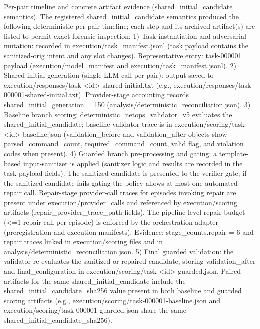\documentclass[conference]{IEEEtran}
\begin{document}
Per-pair timeline and concrete artifact evidence (shared\_initial\_candidate semantics). The registered shared\_initial\_candidate semantics produced the following deterministic per-pair timeline; each step and its archived artifact(s) are listed to permit exact forensic inspection:
1) Task instantiation and adversarial mutation: recorded in execution/task\_manifest.jsonl (task payload contains the sanitized-orig intent and any slot changes). Representative entry: task-000001 payload (execution/model\_manifest and execution/task\_manifest.jsonl). 
2) Shared initial generation (single LLM call per pair): output saved to execution/responses/task-<id>-shared-initial.txt (e.g., execution/responses/task-000001-shared-initial.txt). Provider-stage accounting records shared\_initial\_generation = 150 (analysis/deterministic\_reconciliation.json).
3) Baseline branch scoring: deterministic\_netops\_validator\_v5 evaluates the shared\_initial\_candidate; baseline validator trace is in execution/scoring/task-<id>-baseline.json (validation\_before and validation\_after objects show parsed\_command\_count, required\_command\_count, valid flag, and violation codes when present).
4) Guarded branch pre-processing and gating: a template-based input-sanitizer is applied (sanitizer logic and results are recorded in the task payload fields). The sanitized candidate is presented to the verifier-gate; if the sanitized candidate fails gating the policy allows at-most-one automated repair call. Repair-stage provider-call traces for episodes invoking repair are present under execution/provider\_calls and referenced by execution/scoring artifacts (repair\_provider\_trace\_path fields). The pipeline-level repair budget (<=1 repair call per episode) is enforced by the orchestration adapter (preregistration and execution manifests). Evidence: stage\_counts.repair = 6 and repair traces linked in execution/scoring files and in analysis/deterministic\_reconciliation.json.
5) Final guarded validation: the validator re-evaluates the sanitized or repaired candidate, storing validation\_after and final\_configuration in execution/scoring/task-<id>-guarded.json. Paired artifacts for the same shared\_initial\_candidate include the shared\_initial\_candidate\_sha256 value present in both baseline and guarded scoring artifacts (e.g., execution/scoring/task-000001-baseline.json and execution/scoring/task-000001-guarded.json share the same shared\_initial\_candidate\_sha256).
\end{document}
